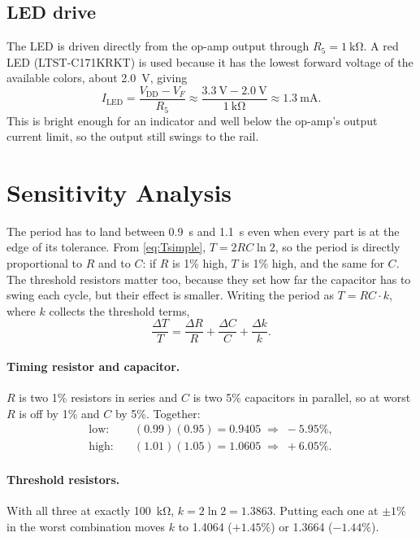 \documentclass[11pt]{article}
\newcommand{\Vdd}{V_{\text{DD}}}
\begin{document}
\subsection{LED drive}
The LED is driven directly from the op-amp output through $R_5 =
\qty{1}{\kilo\ohm}$. A red LED (LTST-C171KRKT) is used because it has the
lowest forward voltage of the available colors, about \qty{2.0}{\volt},
giving
\begin{equation}
  I_{\text{LED}} = \frac{\Vdd - V_F}{R_5}
                 \approx \frac{\qty{3.3}{\volt} - \qty{2.0}{\volt}}{\qty{1}{\kilo\ohm}}
                 \approx \qty{1.3}{\milli\ampere}.
\end{equation}
This is bright enough for an indicator and well below the op-amp's output
current limit, so the output still swings to the rail.

\section{Sensitivity Analysis}
\label{sec:tolerance}
The period has to land between \qty{0.9}{\s} and \qty{1.1}{\s} even when
every part is at the edge of its tolerance. From \cref{eq:Tsimple},
$T = 2RC\ln 2$, so the period is directly proportional to $R$ and to $C$:
if $R$ is 1\% high, $T$ is 1\% high, and the
same for $C$. The threshold resistors matter too, because they set how far
the capacitor has to swing each cycle, but their effect is smaller. Writing
the period as $T = RC \cdot k$, where $k$ collects the threshold terms,
\begin{equation}
  \frac{\Delta T}{T} = \frac{\Delta R}{R} + \frac{\Delta C}{C}
                      + \frac{\Delta k}{k}.
  \label{eq:sens}
\end{equation}

\paragraph{Timing resistor and capacitor.}
$R$ is two 1\% resistors in series and $C$ is two
5\% capacitors in parallel, so at worst $R$ is off by
1\% and $C$ by 5\%. Together:
\begin{align*}
  \text{low:}  \quad & (0.99)(0.95) = 0.9405 \;\Rightarrow\; -5.95\%, \\
  \text{high:} \quad & (1.01)(1.05) = 1.0605 \;\Rightarrow\; +6.05\%.
\end{align*}

\paragraph{Threshold resistors.}
With all three at exactly \qty{100}{\kilo\ohm}, $k = 2\ln 2 = 1.3863$.
Putting each one at $\pm1\%$ in the worst combination moves
$k$ to \num{1.4064} ($+1.45\%$) or \num{1.3664}
($-1.44\%$).
\end{document}

